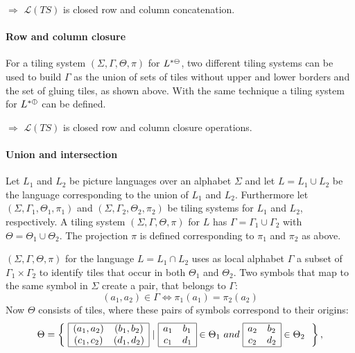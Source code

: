 \documentclass{article}
\begin{document}
$\Rightarrow$ $\mathcal{L}(TS)$ is closed row and column concatenation.

\paragraph{Row and column closure} For a tiling system $(\Sigma, \Gamma, \Theta, \pi)$ for $L^{*\varominus}$, two different tiling systems can be used to build $\Gamma$ as the union of sets of tiles without upper and lower borders and the set of gluing tiles, as shown above. With the same technique a tiling system for $L^{*\varobar}$ can be defined.


$\Rightarrow$ $\mathcal{L}(TS)$ is closed row and column closure operations.



\paragraph{Union and intersection} Let $L_1$ and $L_2$ be picture languages over an alphabet $\Sigma$ and let $L = L_1 \cup L_2$ be the language corresponding to the union of $L_1$ and $L_2$. Furthermore let $(\Sigma, \Gamma_1, \Theta_1, \pi_1)$ and $(\Sigma, \Gamma_2, \Theta_2, \pi_2)$ be tiling systems for $L_1$ and $L_2$, respectively. A tiling system $(\Sigma, \Gamma, \Theta, \pi)$ for $L$ has $\Gamma = \Gamma_1 \cup \Gamma_2$ with $\Theta = \Theta_1 \cup \Theta_2$. The projection $\pi$ is defined corresponding to $\pi_1$ and $\pi_2$ as above.

$(\Sigma, \Gamma, \Theta, \pi)$ for the language $L= L_1 \cap L_2$ uses as local alphabet $\Gamma$ a subset of $\Gamma_1 \times \Gamma_2$ to identify tiles that occur in both $\Theta_1$ and $\Theta_2$. Two symbols that map to the same symbol in $\Sigma$ create a pair, that belongs to $\Gamma$: 
$$(a_1, a_2) \in \Gamma \Leftrightarrow \pi_1(a_1) = \pi_2(a_2)$$
Now $\Theta$ consists of tiles, where these pairs of symbols correspond to their origins:
 $$\Theta=\left\{\ 
 \begin{array}{|cc|}
 \hline
 (a_1,a_2) & (b_1, b_2) \\
 (c_1, c_2) & (d_1, d_2) \\
 \hline
 \end{array}
 \ |\  
 \begin{array}{|cc|}
 \hline
 a_1 & b_1 \\
 c_1 & d_1 \\
 \hline
 \end{array} \in \Theta_1\ and\
  \begin{array}{|cc|}
 \hline
 a_2 & b_2 \\
 c_2 & d_2 \\
 \hline
 \end{array} \in \Theta_2\
 \ \right\},
 $$
\end{document}
